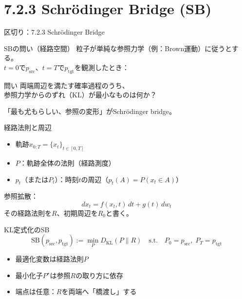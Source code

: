 \section{7.2.3 Schrödinger Bridge (SB)}
\asmain
\begin{frame}{区切り：7.2.3 Schrödinger Bridge}
    \tableofcontents[currentsection]
\end{frame}
\asmain
\begin{frame}{SBの問い（経路空間）}
    粒子が単純な参照力学（例：Brown運動）に従うとする。\\
    $t=0$で$p_{\mathrm{src}}$、$t=T$で$p_{\mathrm{tgt}}$を観測したとき：
    \begin{alertblock}{問い}
        両端周辺を満たす確率過程のうち、\\
        参照力学からのずれ（KL）が最小なものは何か？
    \end{alertblock}
    「最も尤もらしい、参照の変形」がSchrödinger bridge。
\end{frame}
\asmain
\begin{frame}{経路法則と周辺}
    \begin{itemize}
        \item 軌跡$x_{0:T}=\{x_{t}\}_{t\in[0,T]}$
        \item $P$：軌跡全体の法則（経路測度）
        \item $p_{t}$（または$P_{t}$）：時刻$t$の周辺（$p_{t}(A)=P(x_{t}\in A)$）
    \end{itemize}
    参照拡散：
    \[
        dx_{t}
        =
        f(x_{t},t)\,dt
        +
        g(t)\,dw_{t}
        \tag{7.2.6}
    \]
    その経路法則を$R$、初期周辺を$R_{0}$と書く。
\end{frame}
\asmain
\begin{frame}{KL定式化のSB}
    \[
        \mathrm{SB}(p_{\mathrm{src}},p_{\mathrm{tgt}})
        :=
        \min_{P}
        D_{\mathrm{KL}}(P\|R)
        \quad\text{s.t.}\quad
        P_{0}=p_{\mathrm{src}},\;
        P_{T}=p_{\mathrm{tgt}}
        \tag{7.2.7}
    \]
    \begin{itemize}
        \item 最適化変数は経路法則$P$
        \item 最小化子$P^{\star}$は参照$R$の取り方に依存
        \item 端点は任意：$R$を両端へ「橋渡し」する
    \end{itemize}
\end{frame}
